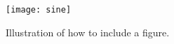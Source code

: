 \begin{figure}
  \centering
  \medskip
  \texttt{[image: sine]}
  \caption{Illustration of how to include a figure. }
  \label{fig:sine}
\end{figure}




\cleardoublepage

